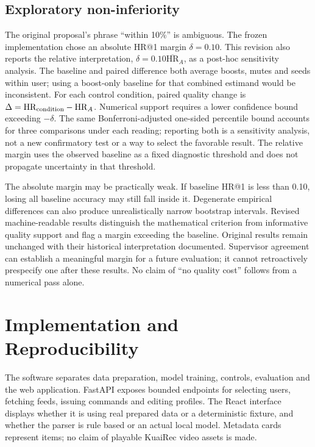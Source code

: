 \documentclass[conference]{IEEEtran}
\begin{document}
\subsection{Exploratory non-inferiority}
The original proposal's phrase ``within 10\%'' is ambiguous. The frozen implementation chose an absolute HR@1 margin $\delta=0.10$. This revision also reports the relative interpretation, $\delta=0.10\overline{\mathrm{HR}}_{A}$, as a post-hoc sensitivity analysis. The baseline and paired difference both average boosts, mutes and seeds within user; using a boost-only baseline for that combined estimand would be inconsistent. For each control condition, paired quality change is $\Delta=\mathrm{HR}_{\rm condition}-\mathrm{HR}_{A}$. Numerical support requires a lower confidence bound exceeding $-\delta$. The same Bonferroni-adjusted one-sided percentile bound accounts for three comparisons under each reading; reporting both is a sensitivity analysis, not a new confirmatory test or a way to select the favorable result. The relative margin uses the observed baseline as a fixed diagnostic threshold and does not propagate uncertainty in that threshold.

The absolute margin may be practically weak. If baseline HR@1 is less than 0.10, losing all baseline accuracy may still fall inside it. Degenerate empirical differences can also produce unrealistically narrow bootstrap intervals. Revised machine-readable results distinguish the mathematical criterion from informative quality support and flag a margin exceeding the baseline. Original results remain unchanged with their historical interpretation documented. Supervisor agreement can establish a meaningful margin for a future evaluation; it cannot retroactively prespecify one after these results. No claim of ``no quality cost'' follows from a numerical pass alone.

\section{Implementation and Reproducibility}
The software separates data preparation, model training, controls, evaluation and the web application. FastAPI exposes bounded endpoints for selecting users, fetching feeds, issuing commands and editing profiles. The React interface displays whether it is using real prepared data or a deterministic fixture, and whether the parser is rule based or an actual local model. Metadata cards represent items; no claim of playable KuaiRec video assets is made.
\end{document}
